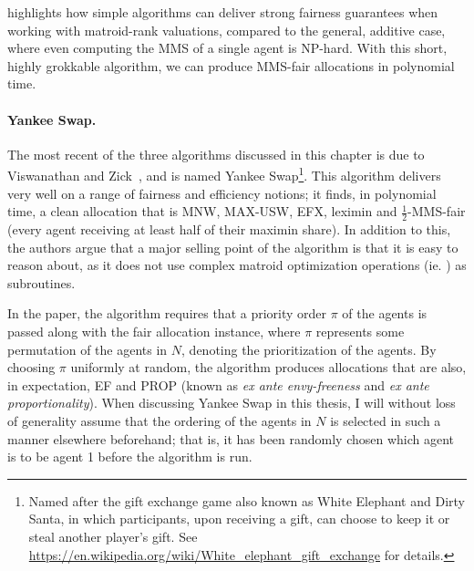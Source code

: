  highlights how simple algorithms can deliver strong fairness guarantees when working with matroid-rank valuations, compared to the general, additive case, where even computing the MMS of a single agent is NP-hard. With this short, highly grokkable algorithm, we can produce MMS-fair allocations in polynomial time.

\paragraph{Yankee Swap.} The most recent of the three algorithms discussed in this chapter is due to Viswanathan and Zick~\cite{viswanathan2023yankee}, and is named Yankee Swap\footnote{Named after the gift exchange game also known as White Elephant and Dirty Santa, in which participants, upon receiving a gift, can choose to keep it or steal another player's gift. See \href{https://en.wikipedia.org/wiki/White_elephant_gift_exchange}{https://en.wikipedia.org/wiki/White\_elephant\_gift\_exchange} for details.}. This algorithm delivers very well on a range of fairness and efficiency notions; it finds, in polynomial time, a clean allocation that is MNW, MAX-USW, EFX, leximin and $\frac{1}{2}$-MMS-fair (every agent receiving at least half of their maximin share). In addition to this, the authors argue that a major selling point of the algorithm is that it is easy to reason about, as it does not use complex matroid optimization operations (ie. ) as subroutines.

In the paper, the algorithm requires that a priority order $\pi$ of the agents is passed along with the fair allocation instance, where $\pi$ represents some permutation of the agents in $N$, denoting the prioritization of the agents. By choosing $\pi$ uniformly at random, the algorithm produces allocations that are also, in expectation, EF and PROP (known as \textit{ex ante envy-freeness} and \textit{ex ante proportionality}). When discussing Yankee Swap in this thesis, I will without loss of generality assume that the ordering of the agents in $N$ is selected in such a manner elsewhere beforehand; that is, it has been randomly chosen which agent is to be agent 1 before the algorithm is run.

